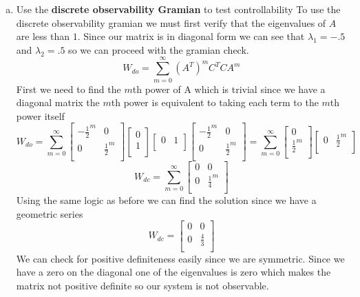 \documentclass{article}
\begin{document}
\begin{enumerate}[a.]
\item Use the \textbf{discrete observability Gramian} to test controllability
\newline
To use the discrete observability gramian we must first verify that the eigenvalues of $A$ are less than $1$.
Since our matrix is in diagonal form we can see that $\lambda_1 = -.5$ and $\lambda_2 = .5$ so we can proceed with the gramian check.
$$W_{do} = \sum_{m=0}^{\infty}(A^T)^mC^TCA^m$$
First we need to find the $m$th power of A which is trivial since we have a diagonal matrix the $m$th power is equivalent to taking each term to the $m$th power itself
$$W_{do} = \sum_{m=0}^{\infty}
\begin{bmatrix}
-\frac{1}{2}^m & 0 \\
0 & \frac{1}{2}^m \\
\end{bmatrix}
\begin{bmatrix}
0 \\
1 \\
\end{bmatrix}
\begin{bmatrix} 0 & 1\\ \end{bmatrix}
\begin{bmatrix}
-\frac{1}{2}^m & 0 \\
0 & \frac{1}{2}^m \\
\end{bmatrix}
= \sum_{m=0}^{\infty}
\begin{bmatrix}
0 \\
\frac{1}{2}^m \\
\end{bmatrix}
\begin{bmatrix}
0 & \frac{1}{2}^m \\
\end{bmatrix}
$$
$$
W_{dc} = \sum_{m=0}^{\infty}
\begin{bmatrix}
0 & 0 \\
0 & \frac{1}{4}^m \\
\end{bmatrix}
$$
Using the same logic as before we can find the solution since we have a geometric series
$$
W_{dc} =
\begin{bmatrix}
0 & 0 \\
0 & \frac{4}{3} \\
\end{bmatrix}
$$
We can check for positive definiteness easily since we are symmetric.
Since we have a zero on the diagonal one of the eigenvalues is zero which makes the matrix not positive definite so our system is not observable.

\end{enumerate}
\end{document}
